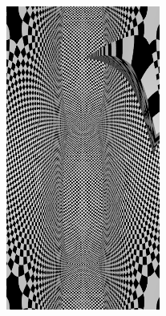 \documentclass[12pt, a4paper]{article}
\begin{document}
\begin{scriptsize}
\begin{ttfamily}

\end{ttfamily}
\end{scriptsize}

\begin{center}
\begin{figure}[H]
\centering
\includegraphics[height=10cm]{./XL-51_3.png}\\
\end{figure}
\end{center}
\end{document}
